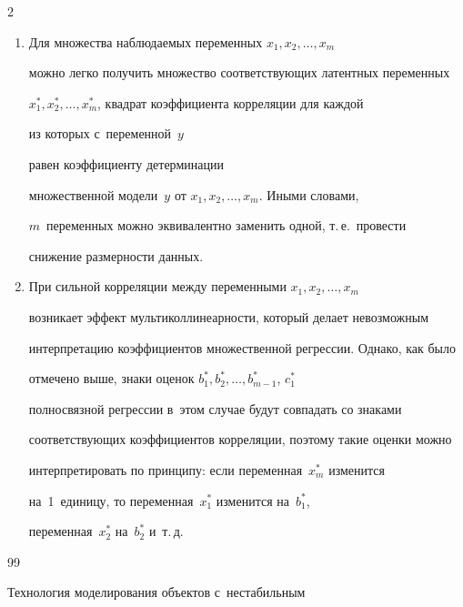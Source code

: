 \begin{multicols}{2}
\begin{enumerate}[1.]
    \item Для множества наблюдаемых переменных $x_1, x_2, \ldots , x_m$ 


можно легко получить множество соответствующих латентных переменных 


$x_1^*, x_2^*, \ldots , x_m^*$, квадрат коэффициента корреляции для каждой 


из которых с~переменной~$y$\linebreak


 равен коэффициенту детерминации 


множественной модели~$y$ от $x_1, x_2, \ldots , x_m$. Иными словами, 


$m$~переменных можно эквивалентно заменить одной, т.\,е.\ провести 


снижение раз\-мер\-ности данных.


    \item При сильной корреляции между переменными $x_1, x_2, \ldots , x_m$ 


возникает эффект мультиколлинеарности, который делает невозможным 


интерпретацию коэффициентов множественной регрессии. Однако, как было 


отмечено выше, знаки оценок $b_1^*, b_2^*, \ldots , b^*_{m-1}$, $c_1^*$ 


полносвязной регрессии в~этом случае будут совпадать со знаками 


соответствующих коэффициентов корреляции, поэтому такие оценки можно 


интерпретировать по принципу: если переменная~$x_m^*$ изменится 


на~1~единицу, то переменная~$x_1^*$ изменится на~$b_1^*$, 


переменная~$x_2^*$ на~$b_2^*$ и~т.\,д.


    \end{enumerate}


    


{\small\frenchspacing


 {%




 \begin{thebibliography}{99}


    




 Технология моделирования объектов с~нестабильным 



\end{thebibliography}}}
\end{multicols}
